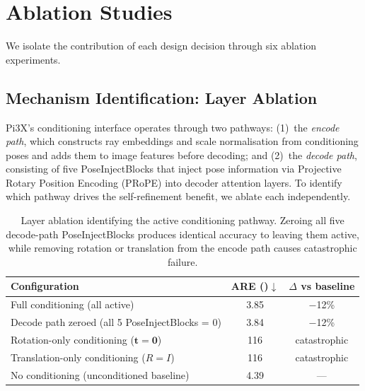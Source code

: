 \section{Ablation Studies}
\label{sec:ablation}

We isolate the contribution of each design decision through six ablation experiments.

\subsection{Mechanism Identification: Layer Ablation}
\label{sec:ablation_mechanism}

Pi3X's conditioning interface operates through two pathways: (1)~the \emph{encode path}, which constructs ray embeddings and scale normalisation from conditioning poses and adds them to image features before decoding; and (2)~the \emph{decode path}, consisting of five PoseInjectBlocks that inject pose information via Projective Rotary Position Encoding (PRoPE) into decoder attention layers. To identify which pathway drives the self-refinement benefit, we ablate each independently.

\begin{table}[h]
\centering
\caption{Layer ablation identifying the active conditioning pathway. Zeroing all five decode-path PoseInjectBlocks produces identical accuracy to leaving them active, while removing rotation or translation from the encode path causes catastrophic failure.}
\label{tab:mechanism}
\begin{tabular}{@{}lcc@{}}
\toprule
Configuration & ARE (\degree{})$\downarrow$ & $\Delta$ vs baseline \\
\midrule
Full conditioning (all active) & 3.85 & $-$12\% \\
Decode path zeroed (all 5 PoseInjectBlocks = 0) & 3.84 & $-$12\% \\
\midrule
Rotation-only conditioning ($\mathbf{t} = \mathbf{0}$) & 116 & catastrophic \\
Translation-only conditioning ($R = I$) & 116 & catastrophic \\
No conditioning (unconditioned baseline) & 4.39 & --- \\
\bottomrule
\end{tabular}
\end{table}

